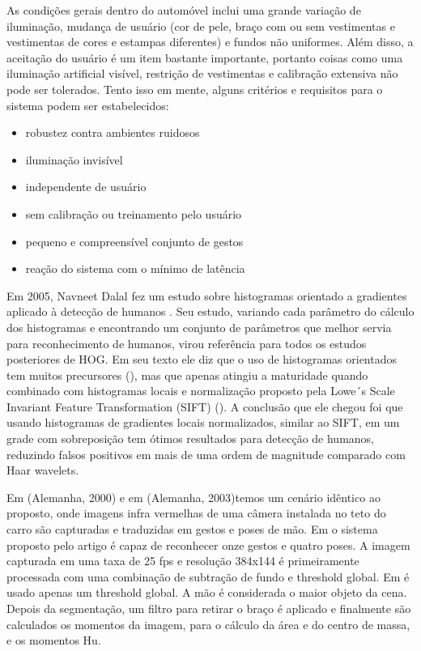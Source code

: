 As condições gerais dentro do automóvel inclui uma grande variação de iluminação, mudança de usuário (cor de pele, braço com ou sem vestimentas e vestimentas de cores e estampas diferentes) e fundos não uniformes. Além disso, a aceitação do usuário é um item bastante importante, portanto coisas como uma iluminação artificial visível, restrição de vestimentas e calibração extensiva não pode ser tolerados. Tento isso em mente, alguns critérios e requisitos para o sistema podem ser estabelecidos:

\begin{itemize}
\item robustez contra ambientes ruidosos
\item iluminação invisível
\item independente de usuário
\item sem calibração ou treinamento pelo usuário
\item pequeno e compreensível conjunto de gestos
\item reação do sistema com o mínimo de latência
\end{itemize}

Em 2005, Navneet Dalal fez um estudo sobre histogramas orientado a gradientes aplicado à detecção de humanos \cite{dalal}. Seu estudo, variando cada parâmetro do cálculo dos histogramas e encontrando um conjunto de parâmetros que melhor servia para reconhecimento de humanos, virou referência para todos os estudos posteriores de HOG. Em seu texto ele diz que o uso de histogramas orientados tem muitos precursores (), mas que apenas atingiu a maturidade quando combinado com histogramas locais e normalização proposto pela Lowe´s Scale Invariant Feature Transformation (SIFT) (). A conclusão que ele chegou foi que usando histogramas de gradientes locais normalizados, similar ao SIFT, em um grade com sobreposição tem ótimos resultados para detecção de humanos, reduzindo falsos positivos em mais de uma ordem de magnitude comparado com Haar wavelets.


Em \cite{ref2} (Alemanha, 2000) e em \cite{ref1} (Alemanha, 2003)temos um cenário idêntico ao proposto, onde imagens infra vermelhas de uma câmera instalada no teto do carro são capturadas e traduzidas em gestos e poses de mão. Em \cite{ref1} o sistema proposto pelo artigo é capaz de reconhecer onze gestos e quatro poses. A imagem capturada em uma taxa de 25 fps e resolução 384x144 é primeiramente processada com uma combinação de subtração de fundo e threshold global. Em \cite{ref2} é usado apenas um threshold global. A mão é considerada o maior objeto da cena. Depois da segmentação, um filtro para retirar o braço é aplicado e finalmente são calculados os momentos da imagem, para o cálculo da área e do centro de massa, e os momentos Hu.

